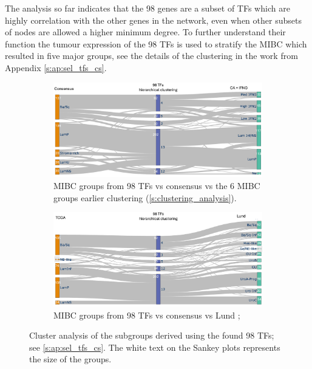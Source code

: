 The analysis so far indicates that the 98 genes are a subset of TFs which are highly correlation with the other genes in the network, even when other subsets of nodes are allowed a higher minimum degree. To further understand their function the tumour expression of the 98 TFs is used to stratify the MIBC which resulted in five major groups, see the details of the clustering in the work from Appendix \cref{s:ap:sel_tfs_cs}.

\begin{figure}[!htb]
    \centering
    \begin{subfigure}[!t]{1.0\textwidth}
        \includegraphics[width=1.0\textwidth,keepaspectratio]{Sections/Network_I/Resources/selective_pruning/sel_tfs/sankey_sel_tfs_VU_CS.png}
        \caption{MIBC groups from 98 TFs vs consensus \citep{Kamoun2020-tj} vs the 6 MIBC groups earlier clustering (\ref{s:clustering_analysis}).}
        \label{fig:N_I:sankey_sel_tfs_vuCs}
    \end{subfigure}
    \begin{subfigure}[!t]{1.0\textwidth}
        \includegraphics[width=1.0\textwidth,keepaspectratio]{Sections/Network_I/Resources/selective_pruning/sel_tfs/sankey_sel_tfs.png}
        \caption{MIBC groups from 98 TFs vs consensus \citep{Kamoun2020-tj} vs Lund \citep{Marzouka2018-ge};}
        \label{fig:N_I:sankey_sel_tfs}
    \end{subfigure}
    \caption{Cluster analysis of the subgroups derived using the found 98 TFs; see \cref{s:ap:sel_tfs_cs}. The white text on the Sankey plots represents the size of the groups. }
    \label{fig:N_I:sel_tfs_cs_analysis}
\end{figure}



